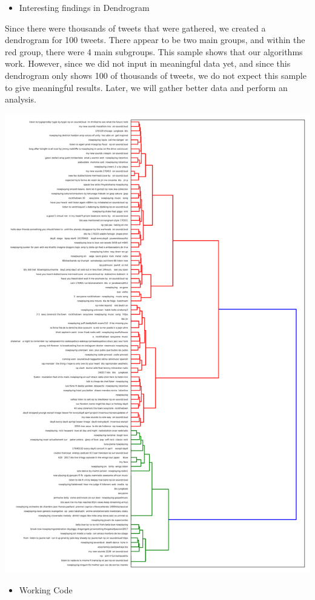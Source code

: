 \documentclass[10pt]{article}
\begin{document}
\begin{itemize}
	\item Interesting findings in Dendrogram
\end{itemize}
Since there were thousands of tweets that were gathered, we created a dendrogram for 100 tweets. There appear to be two main groups, and within the red group, there were 4 main subgroups. This sample shows that our algorithms work. However, since we did not input in meaningful data yet, and since this dendrogram only shows 100 of thousands of tweets, we do not expect this sample to give meaningful results. Later, we will gather better data and perform an analysis.

\includegraphics[scale=0.5]{clusters.png}

\begin{itemize}
	\item Working Code
\end{itemize}
\end{document}
